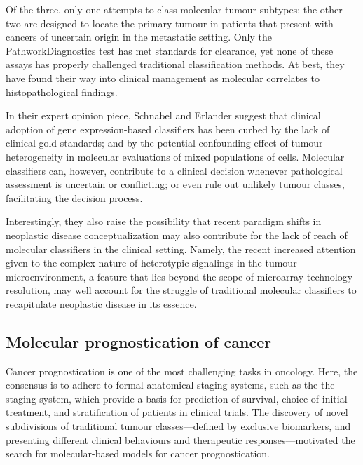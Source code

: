 Of the three, only one attempts to class molecular tumour subtypes; the other
two are designed to locate the primary tumour in patients that present with
cancers of uncertain origin in the metastatic setting.  Only the
PathworkDiagnostics\textregistered{} test has met standards for 
clearance, yet none of these assays has properly challenged traditional
classification methods.  At best, they have found their way into clinical
management as molecular correlates to histopathological findings.

In their expert opinion piece, Schnabel and Erlander suggest that clinical
adoption of gene expression-based classifiers has been curbed by the lack of
clinical gold standards; and by the potential confounding effect of tumour
heterogeneity in molecular evaluations of mixed populations of cells.  Molecular
classifiers can, however, contribute to a clinical decision whenever
pathological assessment is uncertain or conflicting; or even rule out unlikely
tumour classes, facilitating the decision process.

Interestingly, they also raise the possibility that recent paradigm shifts in
neoplastic disease conceptualization may also contribute for the lack of reach
of molecular classifiers in the clinical setting.  Namely, the recent increased
attention given to the complex nature of heterotypic signalings in the tumour
microenvironment,\cite{weigelt_need_2014} a feature that lies beyond the scope
of microarray technology resolution, may well account for the struggle of
traditional molecular classifiers to recapitulate neoplastic disease in its
essence.

\subsection{Molecular prognostication of cancer}
\label{sec:molecular-prediction}

Cancer prognostication is one of the most challenging tasks in oncology.  Here,
the consensus is to adhere to formal anatomical staging systems, such as the the
 staging system,\cite{sobin_tnm:_2003} which provide a basis for
prediction of survival, choice of initial treatment, and stratification of
patients in clinical trials.\cite{ludwig_biomarkers_2005} The discovery of novel
subdivisions of traditional tumour classes---defined by exclusive biomarkers,
and presenting different clinical behaviours and therapeutic
responses---motivated the search for molecular-based models for cancer
prognostication.

